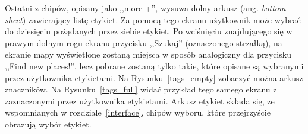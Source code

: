         Ostatni z chipów, opisany jako ,,more +'', wysuwa dolny arkusz (ang. \emph{bottom sheet}) zawierający listę etykiet. Za pomocą tego ekranu użytkownik może wybrać do dziesięciu pożądanych przez siebie 
        etykiet. Po wciśnięciu znajdującego się w prawym dolnym rogu ekranu przycisku ,,Szukaj'' (oznaczonego strzałką), na ekranie mapy wyświetlone zostaną miejsca w sposób analogiczny dla przycisku
        ,,Find new places!'', lecz pobrane zostaną tylko takie, które opisane są wybranymi przez użytkownika etykietami. Na Rysunku~\ref{tags_empty} zobaczyć można arkusz znaczników. Na Rysunku~\ref{tags_full}
        widać przykład tego samego ekranu z zaznaczonymi przez użytkownika etykietami. Arkusz etykiet składa się, ze wspomnianych w rozdziale~\ref{interface}, chipów wyboru, które przejrzyście
        obrazują wybór etykiet.

